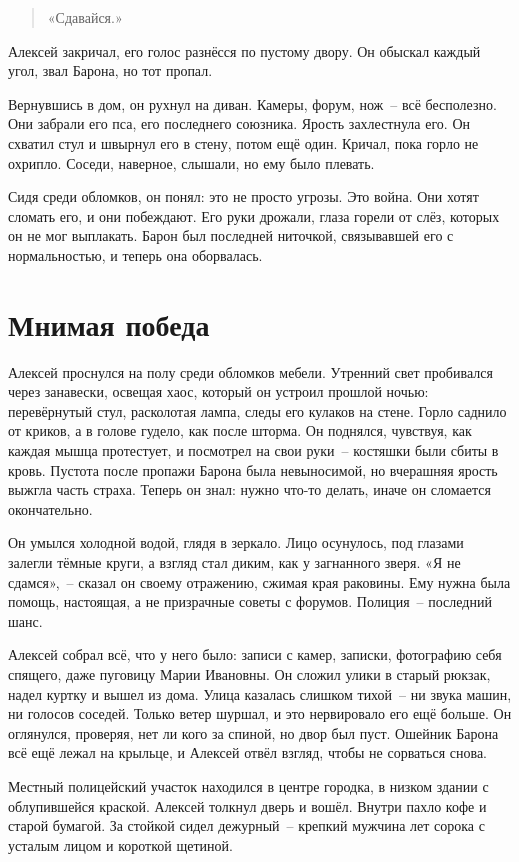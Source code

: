 \documentclass[12pt,a4paper]{book}
\begin{document}
\begin{quote}
«Сдавайся.»
\end{quote}

Алексей закричал, его голос разнёсся по пустому двору. Он обыскал каждый угол, звал Барона, но тот пропал.

Вернувшись в дом, он рухнул на диван. Камеры, форум, нож~-- всё бесполезно. Они забрали его пса, его последнего союзника. Ярость захлестнула его. Он схватил стул и швырнул его в стену, потом ещё один. Кричал, пока горло не охрипло. Соседи, наверное, слышали, но ему было плевать.

Сидя среди обломков, он понял: это не просто угрозы. Это война. Они хотят сломать его, и они побеждают. Его руки дрожали, глаза горели от слёз, которых он не мог выплакать. Барон был последней ниточкой, связывавшей его с нормальностью, и теперь она оборвалась.

\chapter{Мнимая победа}

Алексей проснулся на полу среди обломков мебели. Утренний свет пробивался через занавески, освещая хаос, который он устроил прошлой ночью: перевёрнутый стул, расколотая лампа, следы его кулаков на стене. Горло саднило от криков, а в голове гудело, как после шторма. Он поднялся, чувствуя, как каждая мышца протестует, и посмотрел на свои руки~-- костяшки были сбиты в кровь. Пустота после пропажи Барона была невыносимой, но вчерашняя ярость выжгла часть страха. Теперь он знал: нужно что-то делать, иначе он сломается окончательно.

Он умылся холодной водой, глядя в зеркало. Лицо осунулось, под глазами залегли тёмные круги, а взгляд стал диким, как у загнанного зверя. «Я не сдамся»,~-- сказал он своему отражению, сжимая края раковины. Ему нужна была помощь, настоящая, а не призрачные советы с форумов. Полиция~-- последний шанс.

Алексей собрал всё, что у него было: записи с камер, записки, фотографию себя спящего, даже пуговицу Марии Ивановны. Он сложил улики в старый рюкзак, надел куртку и вышел из дома. Улица казалась слишком тихой~-- ни звука машин, ни голосов соседей. Только ветер шуршал, и это нервировало его ещё больше. Он оглянулся, проверяя, нет ли кого за спиной, но двор был пуст. Ошейник Барона всё ещё лежал на крыльце, и Алексей отвёл взгляд, чтобы не сорваться снова.

Местный полицейский участок находился в центре городка, в низком здании с облупившейся краской. Алексей толкнул дверь и вошёл. Внутри пахло кофе и старой бумагой. За стойкой сидел дежурный~-- крепкий мужчина лет сорока с усталым лицом и короткой щетиной.
\end{document}
